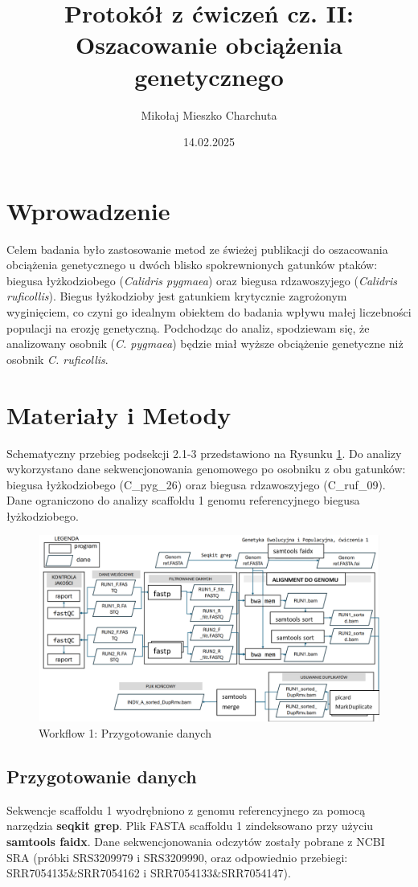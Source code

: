 \documentclass[a4paper, 12pt]{article}
\title{Protokół z ćwiczeń cz. II: Oszacowanie obciążenia genetycznego}
\author{Mikołaj Mieszko Charchuta}
\date{14.02.2025}
\begin{document}
\maketitle

\section{Wprowadzenie}
Celem badania było zastosowanie metod ze świeżej publikacji \cite{Speak2024} do oszacowania obciążenia genetycznego u dwóch blisko spokrewnionych gatunków ptaków: biegusa łyżkodziobego (\textit{Calidris pygmaea}) oraz biegusa rdzawoszyjego (\textit{Calidris ruficollis}). Biegus łyżkodzioby jest gatunkiem krytycznie zagrożonym wyginięciem, co czyni go idealnym obiektem do badania wpływu małej liczebności populacji na erozję genetyczną. Podchodząc do analiz, spodziewam się, że analizowany osobnik (\textit{C. pygmaea}) będzie miał wyższe obciążenie genetyczne niż osobnik \textit{C. ruficollis}.

\section{Materiały i Metody}
Schematyczny przebieg podsekcji 2.1-3 przedstawiono na Rysunku \ref{fig:workflow1}. Do analizy wykorzystano dane sekwencjonowania genomowego po osobniku z obu gatunków: biegusa łyżkodziobego (C\_pyg\_26) oraz biegusa rdzawoszyjego (C\_ruf\_09). Dane ograniczono do analizy scaffoldu 1 genomu referencyjnego biegusa łyżkodziobego. 

\begin{figure}[H]
    \centering
    \includegraphics[width=\textwidth]{img/workflow1.png}
    \caption{Workflow 1: Przygotowanie danych}
    \label{fig:workflow1}
\end{figure}

\subsection{Przygotowanie danych}
Sekwencje scaffoldu 1 wyodrębniono z genomu referencyjnego za pomocą narzędzia \textbf{seqkit grep}. Plik FASTA scaffoldu 1 zindeksowano przy użyciu \textbf{samtools faidx}. 
Dane sekwencjonowania odczytów zostały pobrane z NCBI SRA (próbki SRS3209979 i SRS3209990, oraz odpowiednio przebiegi: SRR7054135\&SRR7054162 i SRR7054133\&SRR7054147). 
\end{document}
